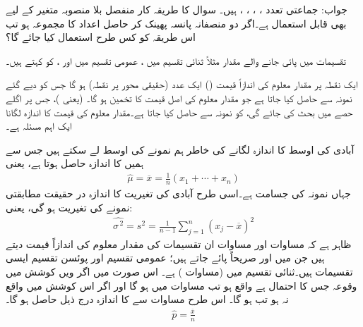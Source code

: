 جواب:\quad
جماعتی تعدد ، ، ، ،  ہیں۔
\quad
سوال  کا طریقہ کار منفصل بلا منصوبہ متغیر کے لیے  بھی قابل استعمال ہے۔اگر دو منصفانہ پانسہ پھینک کر حاصل اعداد کا مجموعہ  ہو تب اس طریقہ کو کس طرح استعمال کیا جائے گا؟

تقسیمات میں پائی جانے والے مقدار مثلاً ثنائی تقسیم میں ، عمومی تقسیم میں  اور ، کو  کہتے ہیں۔

ایک نقطہ پر مقدار معلوم کی اندازاً قیمت ()  ایک عدد (حقیقی محور پر نقطہ) ہو گا جس کو دیے گئے نمونہ سے حاصل کیا جاتا ہے جو مقدار معلوم کی اصل قیمت کا  تخمین ہو گا۔  (یعنی )، جس پر اگلے حصے میں بحث کی جائے گی،  کو نمونہ سے حاصل کیا جاتا ہے۔مقدار معلوم کی قیمت کا اندازہ لگانا ایک اہم مسئلہ ہے۔

آبادی کی اوسط   کا اندازہ لگانے کی خاطر ہم نمونے کی اوسط  لے سکتے ہیں جس سے ہمیں  کا اندازہ   حاصل ہوتا ہے، یعنی
\begin{align}\label{مساوات_شماریات_اندازہ_الف}
\widehat{\mu}=\overline{x}=\frac{1}{n}(x_1+\cdots+x_n)
\end{align}
جہاں نمونہ کی جسامت  ہے۔اسی طرح آبادی کی تغیریت کا اندازہ  در حقیقت مطابقتی نمونے کی تغیریت  ہو گی، یعنی:
\begin{align}\label{مساوات_شماریات_اندازہ_ب}
\widehat{\sigma^{\,2}}=s^2=\frac{1}{n-1}\sum_{j=1}^{n} (x_j-\overline{x})^2
\end{align}   
ظاہر ہے کہ مساوات  اور مساوات   ان تقسیمات کی مقدار معلوم کی اندازاً قیمت دیتے ہیں جن میں  اور  صریحاً پائے جاتے ہیں؛ عمومی تقسیم اور پوئسن تقسیم ایسی تقسیمات ہیں۔ثنائی تقسیم میں  (مساوات ) ہے۔ اس صورت میں  اگر  ویں کوشش میں وقوعہ  جس کا احتمال  ہے واقع ہو تب مساوات  میں  ہو گا اور اگر اس کوشش میں  واقع نہ ہو تب   ہو گا۔ اس طرح مساوات  سے  کا اندازہ درج ذیل حاصل ہو گا۔
\begin{align}
\widehat{p}=\frac{\overline{x}}{n}
\end{align}

